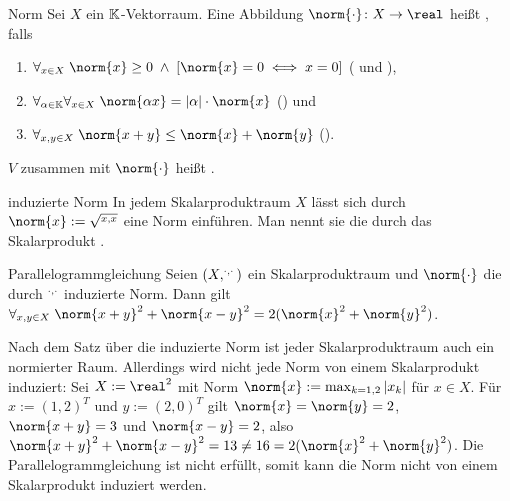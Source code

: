 \begin{Def}{Norm}
    Sei $X$ ein $\mathbb{K}$-Vektorraum.
    Eine Abbildung $\norm{\cdot}\colon X \rightarrow \real$ heißt , falls
    \begin{enumerate}
        \item
        $\forall_{x \in X}\; \norm{x} \ge 0 \;\land\; \left[\norm{x} = 0 \iff x = 0\right]$
        ( und ),

        \item
        $\forall_{\alpha \in \KK} \forall_{x \in X}\; \norm{\alpha x} = |\alpha| \cdot \norm{x}$
        () und

        \item
        $\forall_{x, y \in X}\; \norm{x + y} \le \norm{x} + \norm{y}$
        ().
    \end{enumerate}
    $V$ zusammen mit $\norm{\cdot}$ heißt .
\end{Def}

\linie
\pagebreak

\begin{Satz}{induzierte Norm}
    In jedem Skalarproduktraum $X$ lässt sich durch $\norm{x} := \sqrt{\sp{x, x}}$ eine Norm
    einführen.
    Man nennt sie die durch das Skalarprodukt .
\end{Satz}

\begin{Satz}{Parallelogrammgleichung}
    Seien $(X, \sp{\cdot, \cdot})$ ein Skalarproduktraum und $\norm{\cdot}$ die durch
    $\sp{\cdot, \cdot}$ induzierte Norm.
    Dann gilt
    $\forall_{x, y \in X}\; \norm{x + y}^2 + \norm{x - y}^2 = 2(\norm{x}^2 + \norm{y}^2)$.
\end{Satz}

\begin{Bem}
    Nach dem Satz über die induzierte Norm ist jeder Skalarproduktraum auch ein normierter Raum.
    Allerdings wird nicht jede Norm von einem Skalarprodukt induziert:
    Sei $X := \real^2$ mit Norm $\norm{x} := \max_{k = 1, 2} |x_k|$ für $x \in X$.
    Für $x := (1, 2)^T$ und $y := (2, 0)^T$ gilt $\norm{x} = \norm{y} = 2$,
    $\norm{x + y} = 3$ und $\norm{x - y} = 2$, also
    $\norm{x + y}^2 + \norm{x - y}^2 = 13 \not= 16 = 2(\norm{x}^2 + \norm{y}^2)$.
    Die Parallelogrammgleichung ist nicht erfüllt, somit kann die Norm nicht von einem
    Skalarprodukt induziert werden.
\end{Bem}

